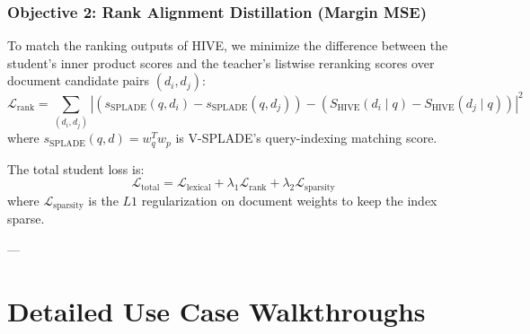 \documentclass[11pt,a4paper]{article}
\begin{document}
\subsubsection{Objective 2: Rank Alignment Distillation (Margin MSE)}
To match the ranking outputs of HIVE, we minimize the difference between the student's inner product scores and the teacher's listwise reranking scores over document candidate pairs $(d_i, d_j)$:
\begin{equation}
\mathcal{L}_{\text{rank}} = \sum_{(d_i, d_j)} \left| (s_{\text{SPLADE}}(q, d_i) - s_{\text{SPLADE}}(q, d_j)) - (S_{\text{HIVE}}(d_i \mid q) - S_{\text{HIVE}}(d_j \mid q)) \right|^2
\end{equation}
where $s_{\text{SPLADE}}(q, d) = w_q^T w_p$ is V-SPLADE's query-indexing matching score.

The total student loss is:
\begin{equation}
\mathcal{L}_{\text{total}} = \mathcal{L}_{\text{lexical}} + \lambda_1 \mathcal{L}_{\text{rank}} + \lambda_2 \mathcal{L}_{\text{sparsity}}
\end{equation}
where $\mathcal{L}_{\text{sparsity}}$ is the $L1$ regularization on document weights to keep the index sparse.

---

\section{Detailed Use Case Walkthroughs}
\end{document}
